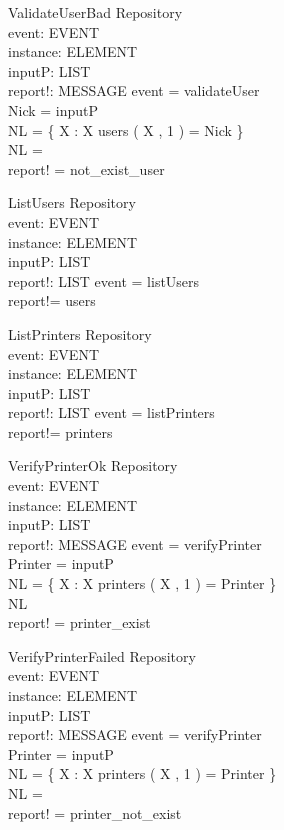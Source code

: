 \begin{schema}{ValidateUserBad}
\Delta Repository \\
event: EVENT \\
instance: ELEMENT \\
inputP: LIST \\
report!: MESSAGE
\where event = validateUser \\
Nick = \head inputP \\
NL = \{ X : \nat \bbar X \mem users \land \nth( X , 1 ) = Nick \} \\
NL = \emptyset \\
report! = not\_exist\_user
\end{schema}

\begin{schema}{ListUsers}
\Delta Repository \\
event: EVENT \\
instance: ELEMENT \\
inputP: LIST \\
report!: LIST
\where event = listUsers \\
report!= users
\end{schema}

\begin{schema}{ListPrinters}
\Delta Repository \\
event: EVENT \\
instance: ELEMENT \\
inputP: LIST \\
report!: LIST
\where event = listPrinters \\
report!= printers
\end{schema}

\begin{schema}{VerifyPrinterOk}
\Delta Repository \\
event: EVENT \\
instance: ELEMENT \\
inputP: LIST \\
report!: MESSAGE
\where event = verifyPrinter \\
Printer = \head inputP \\
NL = \{ X : \nat \bbar X \mem printers \land \nth( X , 1 ) = Printer \} \\
NL \neq \emptyset \\
report! = printer\_exist
\end{schema}


\begin{schema}{VerifyPrinterFailed}
\Delta Repository \\
event: EVENT \\
instance: ELEMENT \\
inputP: LIST \\
report!: MESSAGE
\where event = verifyPrinter \\
Printer = \head inputP \\
NL = \{ X : \nat \bbar X \mem printers \land \nth( X , 1 ) = Printer \} \\
NL = \emptyset \\
report! = printer\_not\_exist
\end{schema}

